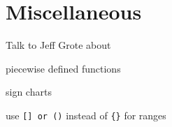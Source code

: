 \documentclass{exam}
\begin{document}
\section{Miscellaneous}

Talk to Jeff Grote about 
\begin{itemize*}
  \item piecewise defined functions
  \item sign charts
  \item use \verb+[] or ()+ instead of \verb+{}+ for ranges
\end{itemize*}
\end{document}
